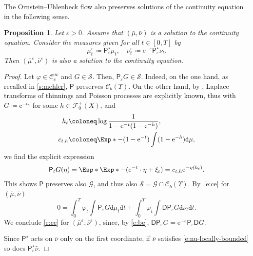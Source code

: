 \documentclass[10pt]{amsart}
\newtheorem{proposition}[theorem]{Proposition}
\theoremstyle{definition}
\theoremstyle{remark}
\begin{document}
The Ornstein--Uhlenbeck flow also preserves solutions of the continuity equation in the following sense.
\begin{proposition}\label{t:stability-ou-solution}
Let $\varepsilon > 0$.
Assume that $(\bar{\mu}, \bar{\nu})$ is a solution to the continuity equation.
Consider the measures given for all $t \in [0,T]$ by
\begin{equation*}
\mu^{\varepsilon}_{t} \coloneq \mathsf{P}_{\varepsilon}^{\star} \mu_{t}, \quad \nu^{\varepsilon}_{t} \coloneq \mathrm{e}^{-\varepsilon} \mathsf{P}_{\varepsilon}^{\star} \nu_{t}.
\end{equation*}
Then $(\bar{\mu}^{\varepsilon}, \bar{\nu}^{\varepsilon})$ is also a solution to the continuity equation.
\end{proposition}

\begin{proof}
Let $\varphi \in \mathscr{C}_{c}^{\infty}$ and $G \in \mathscr{S}$.
Then, $\mathsf{P}_{\varepsilon} G \in \mathscr{S}$.
Indeed, on the one hand, as recalled in \cref{s:mehler}, $\mathsf{P}$ preserves $\mathscr{C}_{b}(\varUpsilon)$.
On the other hand, by \cite[Lem.\,3.1]{Kallenberg}, Laplace transforms of thinnings and Poisson processes are explicitly known, thus with $G \coloneq \mathrm{e}^{-\iota_{h}}$ for some $h \in \mathscr{F}_{0}^{+}(X)$, and
\begin{align*}
h_{t} \coloneq& \log \frac{1}{1 - \mathrm{e}^{-t}(1-\mathrm{e}^{-h})},
\\
c_{t,h} \coloneq& \Exp*{- (1-\mathrm{e}^{-t}) \int (1-\mathrm{e}^{-h}) \mathtt{d} \mu},
\end{align*}
we find the explicit expression
\begin{equation*}
\mathsf{P}_{t}G(\eta) = \Esp*{ \Exp*{ - (\mathrm{e}^{-t} \cdot \eta + \xi_{t})}} = c_{t,h} \mathrm{e}^{-\eta(h_{t})}.
\end{equation*}
This shows $\mathsf{P}$ preserves also $\mathscr{G}$, and thus also $\mathscr{S} = \mathscr{G} \cap \mathscr{C}_{b}(\varUpsilon)$.
By~\cref{e:ce} for $(\bar{\mu}, \bar{\nu})$
\begin{equation*}
0 = \int_{0}^{T} \dot{\varphi}_{t} \int \mathsf{P}_{\varepsilon} G \mathtt{d} \mu_{t} \mathtt{d} t + \int_{0}^{T} \varphi_{t} \int \mathsf{D} \mathsf{P}_{\varepsilon} G \mathtt{d} \nu_{t} \mathtt{d} t.
\end{equation*}
We conclude \cref{e:ce} for $(\bar{\mu}^{\varepsilon}, \bar{\nu}^{\varepsilon})$, since, by \cref{e:be}, $\mathsf{D} \mathsf{P}_{\varepsilon} G = \mathrm{e}^{-\varepsilon} \mathsf{P}_{\varepsilon} \mathsf{D} G$.

Since $\mathsf{P}^{\star}$ acts on $\bar{\nu}$ only on the first coordinate, if $\bar{\nu}$ satisfies \cref{e:nu-locally-bounded} so does $\mathsf{P}^{\star}_{\varepsilon} \bar{\nu}$.
\end{proof}
\end{document}
